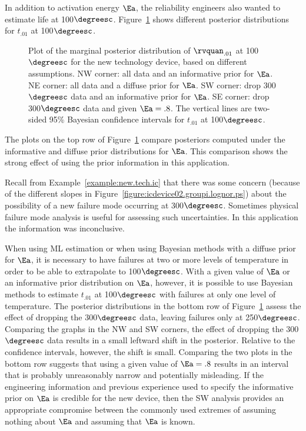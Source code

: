 In addition to activation energy $\Ea$, the reliability engineers
also wanted to estimate life at 100$\degreesc$.
Figure~\ref{figure:nt.device.bayes.quant.ps} shows different
posterior distributions for $t_{.01}$ at 100$\degreesc$.
\begin{figure}
\caption{Plot of the marginal posterior distribution of $\rvquan_{.01}$
at 100$\degreesc$ for the new technology device, based on different
assumptions. NW corner: all data and an informative prior for $\Ea$. NE
corner: all data and a diffuse prior for $\Ea$. SW corner: drop
300$\degreesc$ data and an informative prior for $\Ea$. SE corner: drop
300$\degreesc$ data and given $\Ea = .8$. The vertical lines are two-sided
95\% Bayesian confidence intervals for $t_{.01}$ at 100$\degreesc$.}
\label{figure:nt.device.bayes.quant.ps}
\end{figure}
The plots on the top row of
Figure~\ref{figure:nt.device.bayes.quant.ps} compare posteriors
computed under the informative and diffuse prior distributions for
$\Ea$. This comparison shows the strong effect of using the prior
information in this application.

Recall from Example~\ref{example:new.tech.ic} that there was some
concern (because of the different slopes in
Figure~\ref{figure:icdevice02.groupi.lognor.ps}) about the
possibility of a new failure mode occurring at
300$\degreesc$. Sometimes physical failure mode analysis is useful
for assessing such uncertainties. In this application the
information was inconclusive.

When using ML estimation or when using Bayesian methods with a
diffuse prior for $\Ea$, it is necessary to have failures at two or
more levels of temperature in order to be able to extrapolate to
100$\degreesc$.  With a given value of $\Ea$ or an informative prior
distribution on $\Ea$, however, it is possible to use Bayesian methods
to estimate $t_{.01}$ at 100$\degreesc$ with failures at only one
level of temperature.  The posterior distributions in the bottom row
of Figure~\ref{figure:nt.device.bayes.quant.ps} assess the effect of
dropping the 300$\degreesc$ data, leaving failures only at
250$\degreesc$. Comparing the graphs in the NW and SW corners, the
effect of dropping the 300$\degreesc$ data results in a small
leftward shift in the posterior. Relative to the confidence
intervals, however, the shift is small. Comparing the two plots in
the bottom row suggests that using a given value of $\Ea=.8$ results
in an interval that is probably unreasonably narrow and potentially
misleading. If the engineering information and previous experience
used to specify the informative prior on $\Ea$ is credible for the
new device, then the SW analysis provides an appropriate compromise
between the commonly used extremes of assuming nothing about $\Ea$
and assuming that $\Ea$ is known.

